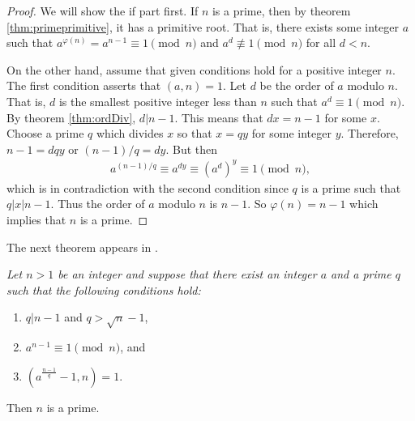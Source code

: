 \documentclass{subfiles}
\begin{document}
		\begin{proof}
			We will show the if part first. If $n$ is a prime, then by theorem \autoref{thm:primeprimitive}, it has a primitive root. That is, there exists some integer $a$ such that $a^{\varphi(n)} = a^{n-1} \equiv 1 \pmod n$ and $a^d \not \equiv 1 \pmod n$ for all $d<n$.

			On the other hand, assume that given conditions hold for a positive integer $n$. The first condition asserts that $(a,n)=1$. Let $d$ be the order of $a$ modulo $n$. That is, $d$ is the smallest positive integer less than $n$ such that $a^d \equiv 1 \pmod n$. By theorem \autoref{thm:ordDiv}, $d|n-1$. This means that $dx = n-1$ for some $x$. Choose a prime $q$ which divides $x$ so that $x=qy$ for some integer $y$. Therefore, $n-1=dqy$ or $(n-1)/q=dy$. But then
				\begin{align*}
					a^{(n-1)/q} \equiv a^{dy} \equiv \left(a^d\right)^y \equiv 1 \pmod n,
				\end{align*}
			which is in contradiction with the second condition since $q$ is a prime such that $q|x|n-1$. Thus the order of $a$ modulo $n$ is $n-1$. So $\varphi(n)=n-1$ which implies that $n$ is a prime.
		\end{proof}
	The next theorem appears in \textcite[Chapter $\S$VI, section $6.3$, proposition $6.3.1$, Page $187$]{koblitz_2012}.
		\begin{theorem}\slshape
			Let $n>1$ be an integer and suppose that there exist an integer $a$ and a prime $q$ such that the following conditions hold:
				\begin{enumerate}
					\item $q|n-1$ and $q > \sqrt n -1$,
					\item $a^{n-1} \equiv1\pmod n$, and
					\item $\left(a^{\frac{n-1}{q}}-1,n\right) = 1$.
				\end{enumerate}
			Then $n$ is a prime.
		\end{theorem}
\end{document}
